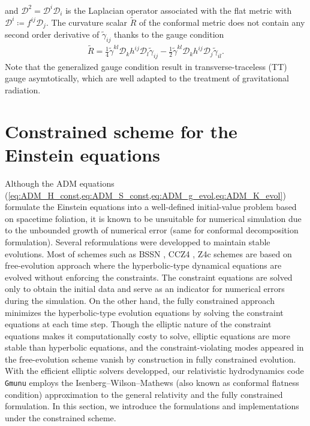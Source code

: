 and $\mathcal{D}^2 = \mathcal{D}^i \mathcal{D}_i$ is the Laplacian operator associated with the flat metric with $\mathcal{D}^i \coloneqq f^{ij}\mathcal{D}_j$.
The curvature scalar $\tilde{R}$ of the conformal metric does not contain any second order derivative of $\tilde{\gamma}_{ij}$ thanks to the gauge condition
\begin{align}
    \tilde{R} = \frac{1}{4} \tilde{\gamma}^{kl} \mathcal{D}_k h^{ij} \mathcal{D}_l \tilde{\gamma}_{ij} 
    - \frac{1}{2} \tilde{\gamma}^{kl} \mathcal{D}_k h^{ij} \mathcal{D}_j \tilde{\gamma}_{il}.
\end{align}
Note that the generalized gauge condition result in transverse-traceless (TT) gauge asymtotically,
which are well adapted to the treatment of gravitational radiation.

\section{Constrained scheme for the Einstein equations}  %
\label{section1.5}
Although the ADM equations (\cref{eq:ADM_H_const,eq:ADM_S_const,eq:ADM_g_evol,eq:ADM_K_evol}) formulate the Einstein equations into a well-defined initial-value problem based on spacetime foliation,
it is known to be unsuitable for numerical simulation due to the unbounded growth of numerical error (same for conformal decomposition formulation).
Several reformulations were developped to maintain stable evolutions.
Most of schemes such as BSSN \cite{shibata1995evolution,baumgarte1998numerical}, CCZ4 \cite{bona2003general}, Z4c \cite{bernuzzi2010constraint} schemes are based on free-evolution approach where the hyperbolic-type dynamical equations are evolved without enforcing the constraints.
The constraint equations are solved only to obtain the initial data and serve as an indicator for numerical errors during the simulation.
On the other hand, the fully constrained approach minimizes the hyperbolic-type evolution equations by solving the constraint equations at each time step.
Though the elliptic nature of the constraint equations makes it computationally costy to solve,
elliptic equations are more stable than hyperbolic equations,
and the constraint-violating modes appeared in the free-evolution scheme vanish by construction in fully constrained evolution.\\
With the efficient elliptic solvers developped,
our relativistic hydrodynamics code \texttt{Gmunu} employs the Isenberg–Wilson–Mathews (also known as conformal flatness condition) approximation to the general relativity
and the fully constrained formulation.
In this section, we introduce the formulations and implementations under the constrained scheme.

